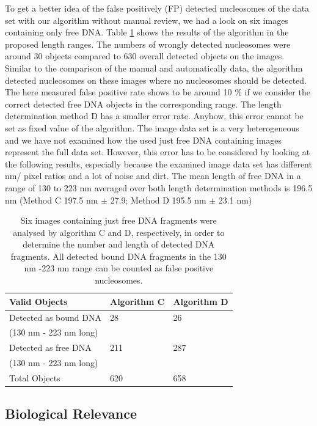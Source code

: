 \documentclass{article}
\begin{document}
To get a better idea of the false positively (FP) detected nucleosomes of the data set with our algorithm without manual review, we had a look on six images containing only free DNA. Table \ref{tab: freeDNA} shows the results of the algorithm in the proposed length ranges. The numbers of wrongly detected nucleosomes were around 30 objects compared to 630 overall detected objects on the images. Similar to the comparison of the manual and automatically data, the algorithm detected nucleosomes on these images where no nucleosomes should be detected. The here measured false positive rate shows to be around 10 \% if we consider the correct detected free DNA objects in the corresponding range. The length determination method D has a smaller error rate. Anyhow, this error cannot be set as fixed value of the algorithm. The image data set is a very heterogeneous and we have not examined how the used just free DNA containing images represent the full data set. However, this error has to be considered by looking at the following results, especially because the examined image data set has different nm/ pixel ratios and a lot of noise and dirt.
The mean length of free DNA in a range of 130 to 223 nm averaged over both length determination methods is 196.5 nm (Method C 197.5 nm $ \pm $ 27.9; Method D 195.5 nm $ \pm $ 23.1 nm)
%
\begin{table}[htbp]
	\centering
	\caption{Six images containing just free DNA fragments were analysed by algorithm C and D, respectively, in order to determine the number and length of detected DNA fragments. All detected bound DNA fragments in the 130 nm -223 nm range can be counted as false positive nucleosomes.}
	\begin{tabular*}{\textwidth}{lll} \hline
		\textbf{Valid Objects} & \textbf{Algorithm C} & \textbf{Algorithm D} \\ \hline
		Detected as bound DNA  & 28    & 26 \\
		(130 nm  - 223 nm long) &    &  \\
		Detected as free DNA  & 211   & 287 \\
		(130 nm  - 223 nm long) &   &  \\
		Total Objects & 620   & 658 \\ \hline
	\end{tabular*}%
	\label{tab: freeDNA}%
\end{table}%

\subsection{Biological Relevance}\label{sec: Biological Relevance}
\end{document}
